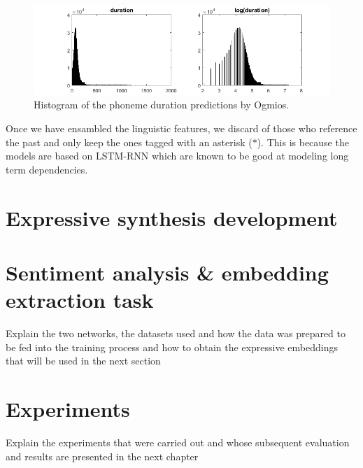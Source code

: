 \begin{figure}[h]
    \centering
    \includegraphics[width=14cm]{figures/dur}
    \caption{Histogram of the phoneme duration predictions by Ogmios.}
    \label{fig:hist-d}
\end{figure}

Once we have ensambled the linguistic features, we discard of those who reference the past and only keep the ones tagged with an asterisk ($*$). This is because the models are based on LSTM-RNN which are known to be good at modeling long term dependencies\cite{hochreiter1997long}.

\section{Expressive synthesis development}

\section{Sentiment analysis \& embedding extraction task}

Explain the two networks, the datasets used and how the data was prepared to be fed into the training process and how to obtain the expressive embeddings that will be used in the next section

\section{Experiments}

Explain the experiments that were carried out and whose subsequent evaluation and results are presented in the next chapter
